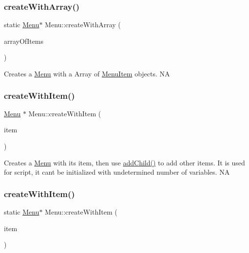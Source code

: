 \subsubsection{\texorpdfstring{create\+With\+Array()}{createWithArray()}\hspace{0.1cm}{\footnotesize\ttfamily [2/2]}}
{\footnotesize\ttfamily static \hyperlink{classMenu}{Menu}$\ast$ Menu\+::create\+With\+Array (\begin{DoxyParamCaption}\item[{const \hyperlink{classVector}{Vector}$<$ \hyperlink{classMenuItem}{Menu\+Item} $\ast$$>$ \&}]{array\+Of\+Items }\end{DoxyParamCaption})\hspace{0.3cm}{\ttfamily [static]}}

Creates a \hyperlink{classMenu}{Menu} with a Array of \hyperlink{classMenuItem}{Menu\+Item} objects.  NA \mbox{\label{classMenu_ac0ed48fb583a961b23f517ae87226c6e}} 
\subsubsection{\texorpdfstring{create\+With\+Item()}{createWithItem()}\hspace{0.1cm}{\footnotesize\ttfamily [1/2]}}
{\footnotesize\ttfamily \hyperlink{classMenu}{Menu} $\ast$ Menu\+::create\+With\+Item (\begin{DoxyParamCaption}\item[{\hyperlink{classMenuItem}{Menu\+Item} $\ast$}]{item }\end{DoxyParamCaption})\hspace{0.3cm}{\ttfamily [static]}}

Creates a \hyperlink{classMenu}{Menu} with it\textquotesingle{}s item, then use \hyperlink{classMenu_af557403e8b14bdbda70d85b7d12fedfb}{add\+Child()} to add other items. It is used for script, it can\textquotesingle{}t be initialized with undetermined number of variables.  NA \mbox{\label{classMenu_a17a3f9e990a403c2b63fb13a713becc3}} 
\subsubsection{\texorpdfstring{create\+With\+Item()}{createWithItem()}\hspace{0.1cm}{\footnotesize\ttfamily [2/2]}}
{\footnotesize\ttfamily static \hyperlink{classMenu}{Menu}$\ast$ Menu\+::create\+With\+Item (\begin{DoxyParamCaption}\item[{\hyperlink{classMenuItem}{Menu\+Item} $\ast$}]{item }\end{DoxyParamCaption})\hspace{0.3cm}{\ttfamily [static]}}

